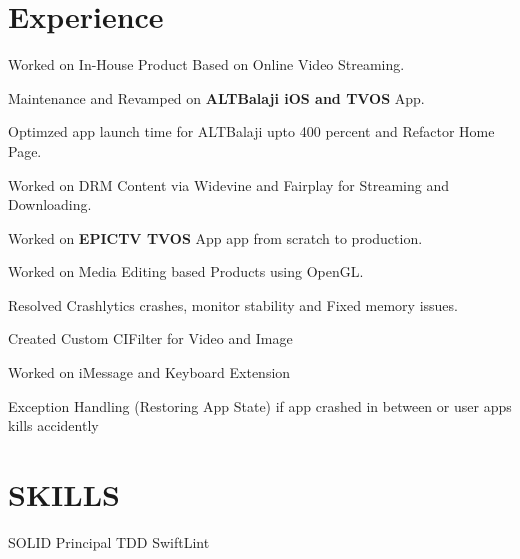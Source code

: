 \documentclass[]{deedy-resume-openfont}
\begin{document}
\hfill
\begin{minipage}[t]{0.66\textwidth} 


\section{Experience}
\vspace{\topsep} %
\begin{tightemize}
\item Worked on In-House Product Based on Online Video Streaming.
\item Maintenance and Revamped on  \textbf{ALTBalaji iOS and TVOS} App.
\item Optimzed app launch time for ALTBalaji upto 400 percent and Refactor Home Page.
\item Worked on DRM Content via Widevine and Fairplay for Streaming and Downloading.
\item Worked on \textbf{EPICTV TVOS} App app from scratch to production.
\end{tightemize}
\sectionsep

\vspace{\topsep} %
\begin{tightemize}
\item Worked on Media Editing based Products using OpenGL.
\item Resolved Crashlytics crashes, monitor stability and Fixed memory issues. 
\item Created Custom CIFilter for Video and Image
\item Worked on iMessage and Keyboard Extension
\item Exception Handling (Restoring App State) if app crashed in between or user apps kills accidently
\end{tightemize}
\sectionsep



\section{SKILLS}
SOLID Principal TDD  SwiftLint\\


\end{minipage}
\end{document}
